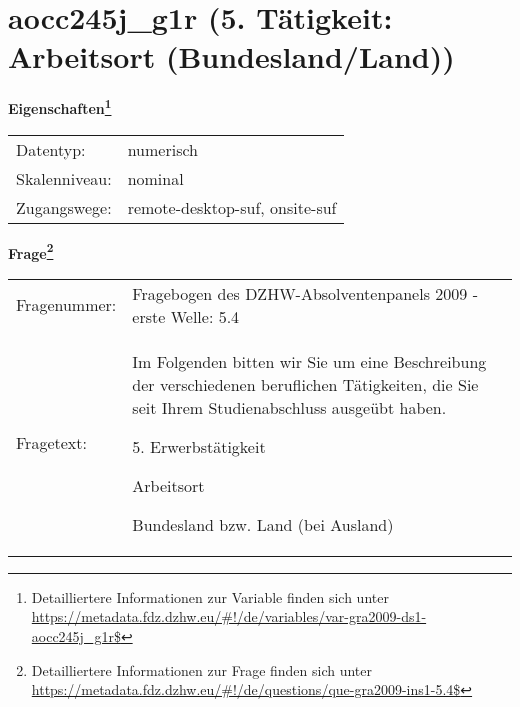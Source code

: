 
    \setcounter{footnote}{0}

    \vspace*{-1.8cm}
	\section{aocc245j\_g1r (5. Tätigkeit: Arbeitsort (Bundesland/Land))}
	\label{section:aocc245j_g1r}



    \vspace*{0.5cm}
    \noindent\textbf{Eigenschaften\footnote{Detailliertere Informationen zur Variable finden sich unter
		\url{https://metadata.fdz.dzhw.eu/\#!/de/variables/var-gra2009-ds1-aocc245j_g1r$}}}\\
	\begin{tabularx}{\hsize}{@{}lX}
	Datentyp: & numerisch \\
	Skalenniveau: & nominal \\
	Zugangswege: &
	  remote-desktop-suf, 
	  onsite-suf
 \\
    \end{tabularx}



				\vspace*{0.5cm}
                \noindent\textbf{Frage\footnote{Detailliertere Informationen zur Frage finden sich unter
		              \url{https://metadata.fdz.dzhw.eu/\#!/de/questions/que-gra2009-ins1-5.4$}}}\\
				\begin{tabularx}{\hsize}{@{}lX}
					Fragenummer: &
					  Fragebogen des DZHW-Absolventenpanels 2009 - erste Welle:
					  5.4
 \\
					Fragetext: & Im Folgenden bitten wir Sie um eine Beschreibung der verschiedenen beruflichen Tätigkeiten, die Sie seit Ihrem Studienabschluss ausgeübt haben.\par  5. Erwerbstätigkeit\par  Arbeitsort\par  Bundesland bzw. Land (bei Ausland) \\
				\end{tabularx}





